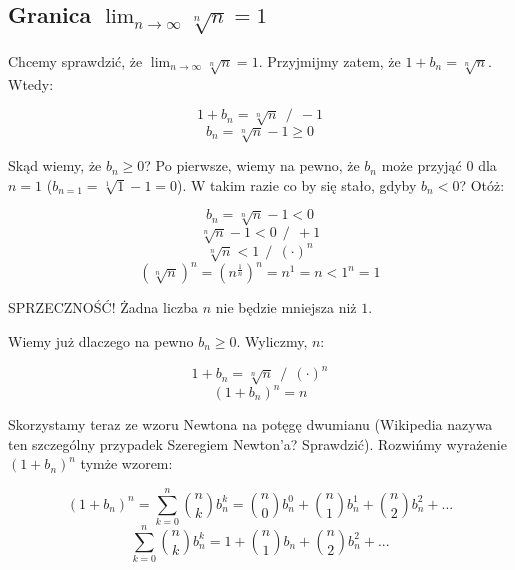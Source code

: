 \documentclass[a4paper,oneside,openright,11pt]{article}
\numberwithin{equation}{section}
\begin{document}
\subsection{Granica $\lim_{n\to\infty} \sqrt[n]{n} = 1$} \label{RudnickiWzor17Ciagi}

Chcemy sprawdzić, że $\lim_{n\to\infty} \sqrt[n]{n} = 1$. Przyjmijmy zatem, że $1 + b_{n} = \sqrt[n]{n}$. Wtedy:

\begin{equation*}
    1 + b_{n} = \sqrt[n]{n} \ \ / \ \ -1
\end{equation*}
\begin{equation*}
    b_{n} = \sqrt[n]{n} - 1 \geq 0
\end{equation*}

\noindent
Skąd wiemy, że $b_{n} \geq 0$? Po pierwsze, wiemy na pewno, że $b_{n}$ może przyjąć $0$ dla $n = 1$ ($b_{n=1} = \sqrt[1]{1} - 1 = 0$). W takim razie co by się stało, gdyby $b_{n} < 0$? Otóż:

\begin{equation*}
    b_{n} = \sqrt[n]{n} - 1 < 0
\end{equation*}
\begin{equation*}
    \sqrt[n]{n} - 1 < 0 \ \ / \ \ +1
\end{equation*}
\begin{equation*}
    \sqrt[n]{n} < 1 \ \ / \ \ (\cdot)^n
\end{equation*}
\begin{equation*}
    (\sqrt[n]{n})^{n} = (n^{\frac{1}{n}})^n = n^1 = n < 1^n = 1
\end{equation*}

\begin{center}
    SPRZECZNOŚĆ! Żadna liczba $n$ nie będzie mniejsza niż $1$.
\end{center}

\noindent
Wiemy już dlaczego na pewno $b_{n} \geq 0$. Wyliczmy, $n$:

\begin{equation*}
    1 + b_{n} = \sqrt[n]{n} \ \ / \ \ (\cdot)^n
\end{equation*}
\begin{equation*}
    (1 + b_{n})^n = n 
\end{equation*}

\noindent
Skorzystamy teraz ze wzoru Newtona na potęgę dwumianu (Wikipedia nazywa ten szczególny przypadek Szeregiem Newton'a? Sprawdzić). Rozwińmy wyrażenie $(1 + b_{n})^n$ tymże wzorem:

\begin{equation*}
    (1 + b_{n})^n = \sum_{k=0}^{n} {n \choose k} b_{n}^{k} = {n \choose 0}b_{n}^{0} + {n \choose 1}b_{n}^{1} + {n \choose 2}b_{n}^{2} + \mbox{...}
\end{equation*}
\begin{equation*}
    \sum_{k=0}^{n} {n \choose k} b_{n}^{k} = 1 + {n \choose 1}b_{n} + {n \choose 2}b_{n}^{2} + \mbox{...}
\end{equation*}
\end{document}
